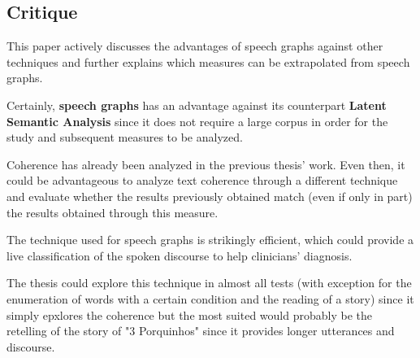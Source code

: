 \documentclass{Paper_Summary}
\begin{document}
\makepapertitle

\breakline

\begin{center}
    \section*{Critique}
\end{center}

    This paper actively discusses the advantages of speech graphs against other techniques and further explains which measures can be extrapolated from speech graphs.

    Certainly, \textbf{speech graphs} has an advantage against its counterpart \textbf{Latent Semantic Analysis} since it does not require a large corpus in order for the study and subsequent measures to be analyzed.

    Coherence has already been analyzed in the previous thesis' work. Even then, it could be advantageous to analyze text coherence through a different technique and evaluate whether the results previously obtained match (even if only in part) the results obtained through this measure.

    The technique used for speech graphs is strikingly efficient, which could provide a live classification of the spoken discourse to help clinicians' diagnosis.

    The thesis could explore this technique in almost all tests (with exception for the enumeration of words with a certain condition and the reading of a story) since it simply epxlores the coherence but the most suited would probably be the retelling of the story of "3 Porquinhos" since it provides longer utterances and discourse.

\breakline
\end{document}
